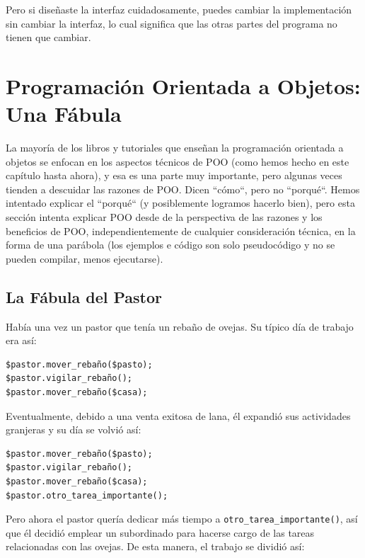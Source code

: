 Pero si diseñaste la interfaz cuidadosamente, puedes cambiar
la implementación sin cambiar la interfaz, lo cual significa que las
otras partes del programa no tienen que cambiar.

\section{Programación Orientada a Objetos: Una Fábula}

La mayoría de los libros y tutoriales que enseñan 
la programación orientada a objetos se enfocan en los
aspectos técnicos de POO (como hemos hecho en este capítulo
hasta ahora), y esa es una parte muy importante, pero algunas
veces tienden a descuidar las razones de POO. Dicen 
``cómo``, pero no ``porqué``. Hemos intentado explicar
el ``porqué`` (y posiblemente logramos hacerlo bien), pero
esta sección intenta explicar POO desde de la perspectiva de las
razones y los beneficios de POO, independientemente de 
cualquier consideración técnica, en la forma de una parábola (los ejemplos
e código son solo pseudocódigo y no se pueden compilar, menos
ejecutarse).

\subsection{La Fábula del Pastor} 

Había una vez un pastor que tenía un rebaño de ovejas. 
Su típico día de trabajo era así:

\begin{verbatim}
$pastor.mover_rebaño($pasto);
$pastor.vigilar_rebaño();
$pastor.mover_rebaño($casa);
\end{verbatim}

Eventualmente, debido a una venta exitosa de lana, él
expandió sus actividades granjeras y su día se volvió
así:

\begin{verbatim}
$pastor.mover_rebaño($pasto);
$pastor.vigilar_rebaño();
$pastor.mover_rebaño($casa);
$pastor.otro_tarea_importante();
\end{verbatim}

Pero ahora el pastor quería dedicar más tiempo a 
\verb|otro_tarea_importante()|, así que él decidió 
emplear un subordinado para hacerse cargo de las tareas
relacionadas con las ovejas. De esta manera, el trabajo
se dividió así:

